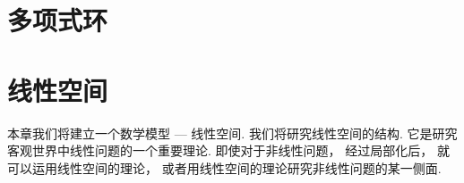 \chapter{多项式环}













\chapter{线性空间}
本章我们将建立一个数学模型 --- 线性空间.
我们将研究线性空间的结构.
它是研究客观世界中线性问题的一个重要理论.
即使对于非线性问题，
经过局部化后，
就可以运用线性空间的理论，
或者用线性空间的理论研究非线性问题的某一侧面.




